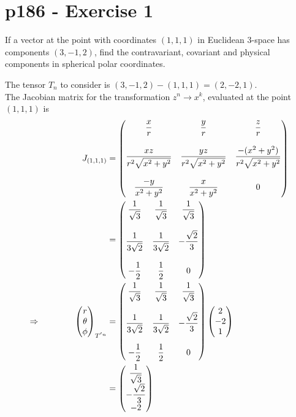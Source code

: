 \section{p186 - Exercise 1}
\begin{tcolorbox}
If a vector at the point with coordinates $\left(1,1,1\right)$ in Euclidean $3$-space has components $\left(3,-1,2\right)$, find the contravariant, covariant and physical components in spherical polar coordinates.
\end{tcolorbox}
The tensor $T_n$ to consider is $\left(3,-1,2\right) - \left(1,1,1\right)= \left(2,-2,1\right)$.\\
The Jacobian matrix for the transformation $z^n \rightarrow x^k$, evaluated at the point $\left(1,1,1\right)$ is 
\begin{align}
J_{\left(1,1,1\right)}&={\begin{pmatrix}{\dfrac {x}{r}}&{\dfrac {y}{r}}&{\dfrac {z}{r}}\\\\{\dfrac {xz}{r^{2}{\sqrt {x^{2}+y^{2}}}}}&{\dfrac {yz}{r^{2}{\sqrt {x^{2}+y^{2}}}}}&{\dfrac {-(x^{2}+y^{2})}{r^{2}{\sqrt {x^{2}+y^{2}}}}}\\\\{\dfrac {-y}{x^{2}+y^{2}}}&{\dfrac {x}{x^{2}+y^{2}}}&0\end{pmatrix}}\\
&=\begin{pmatrix}\dfrac {1}{\sqrt{3}}&\dfrac {1}{\sqrt{3}}&\dfrac {1}{\sqrt{3}}\\\\ \dfrac {1}{3\sqrt{2}}& \dfrac {1}{3\sqrt{2}}&-\dfrac {\sqrt{2}}{3}\\\\ -\dfrac {1}{2}&\dfrac {1}{2}&0\end{pmatrix}\\
\Rightarrow \quad\quad\quad\quad 
\begin{pmatrix}
r\\
\theta\\
\phi
\end{pmatrix}_{T^{'n}}&=\begin{pmatrix}\dfrac {1}{\sqrt{3}}&\dfrac {1}{\sqrt{3}}&\dfrac {1}{\sqrt{3}}\\\\ \dfrac {1}{3\sqrt{2}}& \dfrac {1}{3\sqrt{2}}&-\dfrac {\sqrt{2}}{3}\\\\ -\dfrac {1}{2}&\dfrac {1}{2}&0\end{pmatrix}\begin{pmatrix}
2\\
-2\\
1
\end{pmatrix}\\
&=\begin{pmatrix}
\dfrac {1}{\sqrt{3}}\\
-\dfrac {\sqrt{2}}{3}\\
-2
\end{pmatrix}
\end{align}
